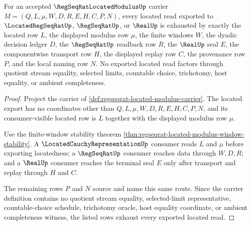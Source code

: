 \begin{theorem}
\label{thm:regseqrat-located-modulus-located-row-exhaustion}
For an accepted $\RegSeqRatLocatedModulusUp$ carrier $M=(Q,L,\mu,W,D,R,E,H,C,P,N)$, every located read exported to $\LocatedRegSeqRatUp$, $\RegSeqRatUp$, or $\RealUp$ is exhausted by exactly the located row $L$, the displayed modulus row $\mu$, the finite windows $W$, the dyadic decision ledger $D$, the $\RegSeqRatUp$ readback row $R$, the $\RealUp$ seal $E$, the componentwise transport row $H$, the displayed replay row $C$, the provenance row $P$, and the local naming row $N$. No exported located read factors through quotient stream equality, selected limits, countable choice, trichotomy, host equality, or ambient completeness.
\end{theorem}
\begin{proof}
Project the carrier of \autoref{def:regseqrat-located-modulus-carrier}. The located export has no coordinates other than $Q,L,\mu,W,D,R,E,H,C,P,N$, and its consumer-visible located row is $L$ together with the displayed modulus row $\mu$.

Use the finite-window stability theorem \autoref{thm:regseqrat-located-modulus-window-stability}. A $\LocatedCauchyRepresentationUp$ consumer reads $L$ and $\mu$ before exporting locatedness; a $\RegSeqRatUp$ consumer reaches data through $W,D,R$; and a $\RealUp$ consumer reaches the terminal seal $E$ only after transport and replay through $H$ and $C$.

The remaining rows $P$ and $N$ source and name this same route. Since the carrier definition contains no quotient stream equality, selected-limit representative, countable-choice schedule, trichotomy oracle, host equality coordinate, or ambient completeness witness, the listed rows exhaust every exported located read.
\end{proof}

